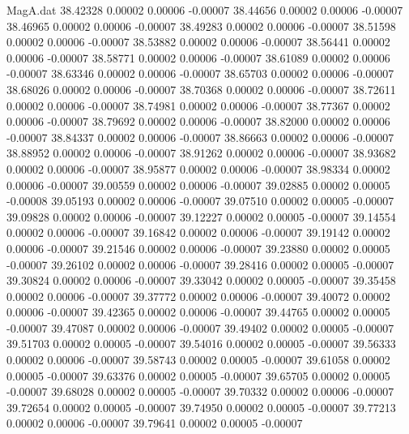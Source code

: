 \begin{filecontents}{MagA.dat}
  38.42328    0.00002    0.00006   -0.00007
  38.44656    0.00002    0.00006   -0.00007
  38.46965    0.00002    0.00006   -0.00007
  38.49283    0.00002    0.00006   -0.00007
  38.51598    0.00002    0.00006   -0.00007
  38.53882    0.00002    0.00006   -0.00007
  38.56441    0.00002    0.00006   -0.00007
  38.58771    0.00002    0.00006   -0.00007
  38.61089    0.00002    0.00006   -0.00007
  38.63346    0.00002    0.00006   -0.00007
  38.65703    0.00002    0.00006   -0.00007
  38.68026    0.00002    0.00006   -0.00007
  38.70368    0.00002    0.00006   -0.00007
  38.72611    0.00002    0.00006   -0.00007
  38.74981    0.00002    0.00006   -0.00007
  38.77367    0.00002    0.00006   -0.00007
  38.79692    0.00002    0.00006   -0.00007
  38.82000    0.00002    0.00006   -0.00007
  38.84337    0.00002    0.00006   -0.00007
  38.86663    0.00002    0.00006   -0.00007
  38.88952    0.00002    0.00006   -0.00007
  38.91262    0.00002    0.00006   -0.00007
  38.93682    0.00002    0.00006   -0.00007
  38.95877    0.00002    0.00006   -0.00007
  38.98334    0.00002    0.00006   -0.00007
  39.00559    0.00002    0.00006   -0.00007
  39.02885    0.00002    0.00005   -0.00008
  39.05193    0.00002    0.00006   -0.00007
  39.07510    0.00002    0.00005   -0.00007
  39.09828    0.00002    0.00006   -0.00007
  39.12227    0.00002    0.00005   -0.00007
  39.14554    0.00002    0.00006   -0.00007
  39.16842    0.00002    0.00006   -0.00007
  39.19142    0.00002    0.00006   -0.00007
  39.21546    0.00002    0.00006   -0.00007
  39.23880    0.00002    0.00005   -0.00007
  39.26102    0.00002    0.00006   -0.00007
  39.28416    0.00002    0.00005   -0.00007
  39.30824    0.00002    0.00006   -0.00007
  39.33042    0.00002    0.00005   -0.00007
  39.35458    0.00002    0.00006   -0.00007
  39.37772    0.00002    0.00006   -0.00007
  39.40072    0.00002    0.00006   -0.00007
  39.42365    0.00002    0.00006   -0.00007
  39.44765    0.00002    0.00005   -0.00007
  39.47087    0.00002    0.00006   -0.00007
  39.49402    0.00002    0.00005   -0.00007
  39.51703    0.00002    0.00005   -0.00007
  39.54016    0.00002    0.00005   -0.00007
  39.56333    0.00002    0.00006   -0.00007
  39.58743    0.00002    0.00005   -0.00007
  39.61058    0.00002    0.00005   -0.00007
  39.63376    0.00002    0.00005   -0.00007
  39.65705    0.00002    0.00005   -0.00007
  39.68028    0.00002    0.00005   -0.00007
  39.70332    0.00002    0.00006   -0.00007
  39.72654    0.00002    0.00005   -0.00007
  39.74950    0.00002    0.00005   -0.00007
  39.77213    0.00002    0.00006   -0.00007
  39.79641    0.00002    0.00005   -0.00007

\end{filecontents}
